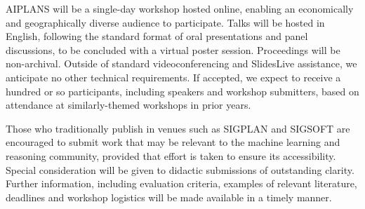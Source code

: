 \documentclass{article}
\begin{document}
    AIPLANS will be a single-day workshop hosted online, enabling an economically and geographically diverse audience to participate. Talks will be hosted in English, following the standard format of oral presentations and panel discussions, to be concluded with a virtual poster session. Proceedings will be non-archival. Outside of standard videoconferencing and SlidesLive assistance, we anticipate no other technical requirements. If accepted, we expect to receive a hundred or so participants, including speakers and workshop submitters, based on attendance at similarly-themed workshops in prior years.

    Those who traditionally publish in venues such as SIGPLAN and SIGSOFT are encouraged to submit work that may be relevant to the machine learning and reasoning community, provided that effort is taken to ensure its accessibility. Special consideration will be given to didactic submissions of outstanding clarity. Further information, including evaluation criteria, examples of relevant literature, deadlines and workshop logistics will be made available in a timely manner.

\end{document}

